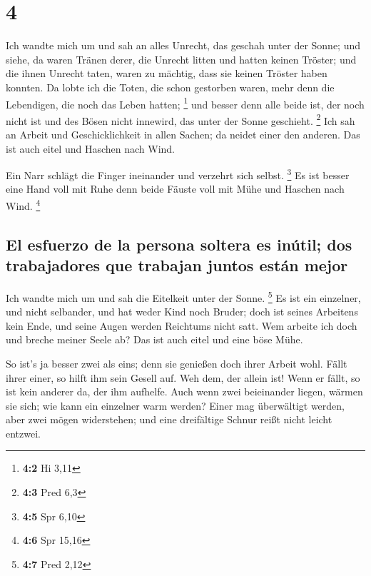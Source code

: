 \hypertarget{section-3}{%
\section{4}\label{section-3}}

 Ich wandte mich um und sah an alles Unrecht, das geschah
unter der Sonne; und siehe, da waren Tränen derer, die Unrecht litten
und hatten keinen Tröster; und die ihnen Unrecht taten, waren zu
mächtig, dass sie keinen Tröster haben konnten.  Da lobte
ich die Toten, die schon gestorben waren, mehr denn die Lebendigen, die
noch das Leben hatten; \footnote{\textbf{4:2} Hi 3,11} 
und besser denn alle beide ist, der noch nicht ist und des Bösen nicht
innewird, das unter der Sonne geschieht. \footnote{\textbf{4:3} Pred 6,3}
 Ich sah an Arbeit und Geschicklichkeit in allen Sachen;
da neidet einer den anderen. Das ist auch eitel und Haschen nach Wind.

 Ein Narr schlägt die Finger ineinander und verzehrt sich
selbst. \footnote{\textbf{4:5} Spr 6,10}  Es ist besser
eine Hand voll mit Ruhe denn beide Fäuste voll mit Mühe und Haschen nach
Wind. \footnote{\textbf{4:6} Spr 15,16}

\hypertarget{el-esfuerzo-de-la-persona-soltera-es-inuxfatil-dos-trabajadores-que-trabajan-juntos-estuxe1n-mejor}{%
\subsection{El esfuerzo de la persona soltera es inútil; dos
trabajadores que trabajan juntos están
mejor}\label{el-esfuerzo-de-la-persona-soltera-es-inuxfatil-dos-trabajadores-que-trabajan-juntos-estuxe1n-mejor}}

 Ich wandte mich um und sah die Eitelkeit unter der Sonne.
\footnote{\textbf{4:7} Pred 2,12}  Es ist ein einzelner,
und nicht selbander, und hat weder Kind noch Bruder; doch ist seines
Arbeitens kein Ende, und seine Augen werden Reichtums nicht satt. Wem
arbeite ich doch und breche meiner Seele ab? Das ist auch eitel und eine
böse Mühe.

 So ist's ja besser zwei als eins; denn sie genießen doch
ihrer Arbeit wohl.  Fällt ihrer einer, so hilft ihm sein
Gesell auf. Weh dem, der allein ist! Wenn er fällt, so ist kein anderer
da, der ihm aufhelfe.  Auch wenn zwei beieinander liegen,
wärmen sie sich; wie kann ein einzelner warm werden? 
Einer mag überwältigt werden, aber zwei mögen widerstehen; und eine
dreifältige Schnur reißt nicht leicht entzwei.

